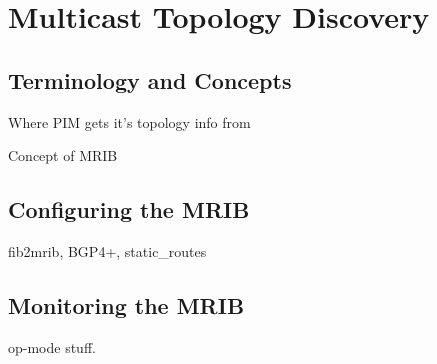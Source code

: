 \chapter{Multicast Topology Discovery}

\section{Terminology and Concepts}

Where PIM gets it's topology info from

Concept of MRIB

\section{Configuring the MRIB}

fib2mrib, BGP4+, static\_routes

\section{Monitoring the MRIB}

op-mode stuff.








